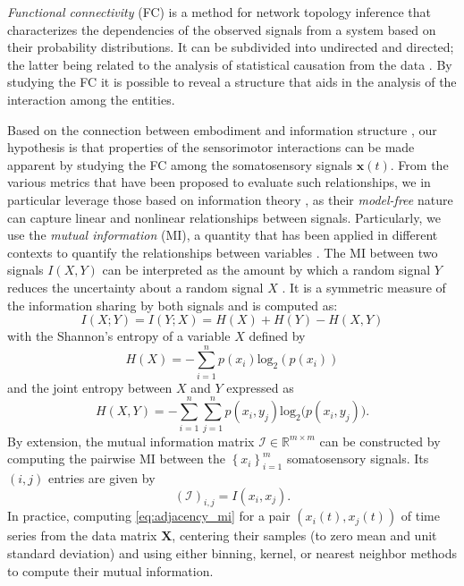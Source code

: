 \emph{Functional connectivity} (FC) is a method for network topology inference that characterizes the dependencies of the observed signals from a system based on their probability distributions\cite{Friston2011Functionaleffectiveconnectivity}. It can be subdivided into undirected and directed; the latter being related to the analysis of statistical causation from the data \cite{Bastos2016tutorialreviewfunctional}. By studying the FC  it is possible to reveal a structure that aids in the analysis of the interaction among the entities.

Based on the connection between embodiment and information structure \cite{Pfeifer2007Selforganizationembodiment}, our hypothesis is that properties of the sensorimotor interactions can be made apparent by studying the FC among the somatosensory signals $ \bm{x}(t) $. From the various metrics that have been proposed to evaluate such relationships, we in particular leverage those based on information theory \cite{Bonsignorio2020EntropyBasedMetrics,Bonsignorio2013Quantifyingevolutionaryself}, as their \emph{model-free} nature can capture linear and nonlinear relationships between signals. Particularly, we use the \emph{mutual information} (MI), a quantity that has been applied in different contexts to quantify the relationships between variables \cite{Steuer2002mutualinformationdetecting}. The MI between two signals $ I\left(X,Y\right) $ can be interpreted as the amount by which a random signal $ Y $ reduces the uncertainty about a random signal $ X $ \cite{Cover1999Elementsinformationtheory}. It is a symmetric measure of the information sharing by both signals and is computed as:
\begin{equation}\label{eq:mutual_information}
	I\left(X;Y\right) =I\left(Y;X\right) = H(X) + H(Y) - H(X,Y)
\end{equation}
with the Shannon's entropy of a variable $X$ defined by 
\begin{equation}\label{eq:entropy}
	H(X) = -\sum_{i=1}^{n}p(x_i)\text{log}_2\left(p\left(x_i\right)\right)
\end{equation}
and the joint entropy between $ X $ and $ Y $ expressed as
\begin{equation}\label{eq:joint_entropy}
	H(X,Y) = -\sum_{i=1}^{n}\sum_{j=1}^{n} p(x_i,y_j)\text{log}_2\big(p\left(x_i,y_j\right)\big).
\end{equation}
By extension, the mutual information matrix $\bm{\mathcal{I}} \in \mathbb{R}^{m \times m}$ can be constructed by computing the pairwise MI between the $\left\lbrace x_i\right\rbrace^m_{i=1}$ somatosensory signals. Its $(i,j)$ entries are given by
\begin{equation}\label{eq:adjacency_mi}
	(\bm{\mathcal{I}})_{i,j} = I(x_i,x_j).
\end{equation}
In practice, computing \eqref{eq:adjacency_mi}  for a pair $\left({x}_i(t),{x}_j(t)\right)$ of time series from the data matrix $\bm{X}$, centering their samples (to zero mean and unit standard deviation) and using either binning, kernel, or nearest neighbor methods \cite{WaltersWilliams2009Estimationmutualinformation} to compute their mutual information. 

